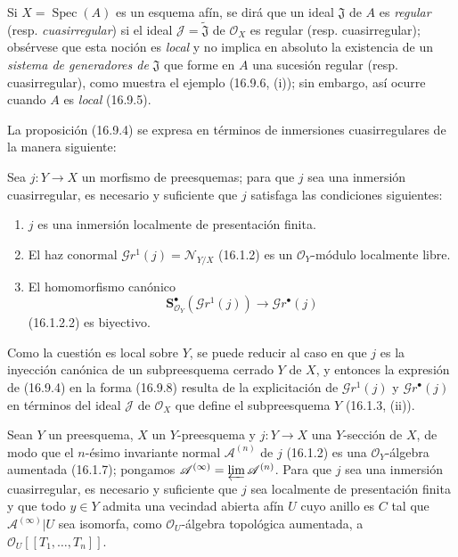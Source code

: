 \begin{env}[16.9.7]
\label{IV.16.9.7}
Si $X=\operatorname{Spec}(A)$ es un esquema afín, se dirá que un ideal
$\mathfrak J$ de $A$ es \emph{regular} (resp. \emph{cuasirregular}) si el ideal
$\mathscr J=\widetilde{\mathfrak J}$ de $\mathcal{O}_X$ es regular
(resp. cuasirregular); obsérvese que esta noción es \emph{local} y no implica en
absoluto la existencia de un \emph{sistema de generadores de} $\mathfrak J$ que
forme en $A$ una sucesión regular (resp. cuasirregular), como muestra el
ejemplo (16.9.6, (i)); sin embargo, así ocurre cuando $A$ es \emph{local} (16.9.5).

La proposición (16.9.4) se expresa en términos de inmersiones cuasirregulares
de la manera siguiente:
\end{env}

\begin{proposition}[16.9.8]
\label{IV.16.9.8}
Sea $j:Y\to X$ un morfismo de preesquemas; para que $j$ sea una inmersión
cuasirregular, es necesario y suficiente que $j$ satisfaga las condiciones
siguientes:
\begin{enumerate}
  \item[\textup{(i)}] $j$ es una inmersión localmente de presentación finita.
  \item[\textup{(ii)}] El haz conormal
  $\mathscr Gr^1(j)=\mathcal{N}_{Y/X}$ \textup{(16.1.2)} es un
  $\mathcal{O}_Y$-módulo localmente libre.
  \item[\textup{(iii)}] El homomorfismo canónico
  \[
    \mathbf S_{\mathcal{O}_Y}^{\bullet}
      (\mathscr Gr^1(j))\longrightarrow\mathscr Gr^{\bullet}(j)
  \]
  \textup{(16.1.2.2)} es biyectivo.
\end{enumerate}
\end{proposition}

Como la cuestión es local sobre $Y$, se puede reducir al caso en que $j$ es
la inyección canónica de un subpreesquema cerrado $Y$ de $X$, y entonces la
expresión de (16.9.4) en la forma (16.9.8) resulta de la explicitación de
$\mathscr Gr^1(j)$ y $\mathscr Gr^{\bullet}(j)$ en términos del
ideal $\mathscr J$ de $\mathcal{O}_X$ que define el subpreesquema $Y$
(16.1.3, (ii)).

\begin{corollary}[16.9.9]
\label{IV.16.9.9}
Sean $Y$ un preesquema, $X$ un $Y$-preesquema y $j:Y\to X$ una $Y$-sección
de $X$, de modo que el $n$-ésimo invariante normal $\mathscr{A}^{(n)}$ de $j$
\textup{(16.1.2)} es una $\mathcal{O}_Y$-álgebra aumentada \textup{(16.1.7)}; pongamos
$\mathscr{A}^{(\infty)}=\varprojlim\mathscr{A}^{(n)}$. Para que $j$ sea una
inmersión cuasirregular, es necesario y suficiente que $j$ sea localmente de
presentación finita y que todo $y\in Y$ admita una vecindad abierta afín $U$
cuyo anillo es $C$ tal que $\mathscr{A}^{(\infty)}|U$ sea isomorfa, como
$\mathcal{O}_U$-álgebra topológica aumentada, a
$\mathcal{O}_U[[T_1,\ldots,T_n]]$.
\end{corollary}

